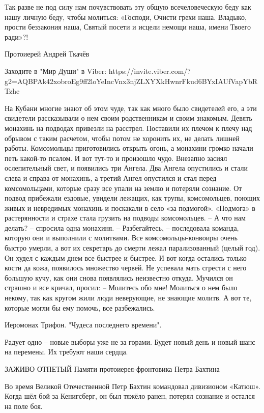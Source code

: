 Так разве не под силу нам почувствовать эту общую всечеловеческую беду как нашу
личную беду, чтобы молиться: «Господи, Очисти грехи наша. Владыко, прости
беззакония наша, Святый посети и исцели немощи наша, имени Твоего ради»?!

Протоиерей Андрей Ткачёв

Заходите в "Мир Души" в Viber: https://invite.viber.com/?g2=AQBPAk42xobroEg9ff2loYeIncVnx3njZLXYXkHwnrFkud6BYxIAUfVapYbRTzhe

На Кубани многие знают об этом чуде, так как много было свидетелей его, а эти свидетели рассказывали о нем своим родственникам и своим знакомым.
Девять монахинь на подводах привезли на расстрел. Поставили их плечом к плечу над обрывом с таким расчетом, чтобы потом не хоронить их, не делать лишней работы.
Комсомольцы приготовились открыть огонь, а монахини громко начали петь какой-то псалом.
И вот тут-то и произошло чудо. Внезапно засиял ослепительный свет, и появились три Ангела. Два Ангела опустились и стали слева и справа от монахинь, а третий Ангел опустился и стал перед комсомольцами, которые сразу все упали на землю и потеряли сознание.
От подвод прибежали ездовые, увидели лежащих, как трупы, комсомольцев, поющих живых и невредимых монахинь и поскакали в село «за подмогой». «Подмога» в растерянности и страхе стала грузить на подводы комсомольцев. – А что нам делать? – спросила одна монахиня. – Разбегайтесь, – последовала команда, которую они и выполнили с молитвами.
Все комсомольцы-конвоиры очень быстро умерли, а вот их секретарь до смерти лежал парализованный (целый год). Он худел с каждым днем все быстрее и быстрее. И вот когда остались только кости да кожа, появилось множество червей. Не успевала мать сгрести с него большую кучу, как они снова появлялись неизвестно откуда.
Мучился он страшно и все кричал, просил: – Молитесь обо мне!
Молиться о нем было некому, так как кругом жили люди неверующие, не знающие молитв.
А вот те, которые могли бы ему помочь, все разбежались.

Иеромонах Трифон. "Чудеса последнего времени".

Радует одно – новые выборы уже не за горами. Будет новый день и новый шанс на перемены.
Их требуют наши сердца.

ЗАЖИВО ОТПЕТЫЙ
Памяти протоиерея-фронтовика Петра Бахтина

Во время Великой Отечественной Петр Бахтин командовал дивизионом «Катюш». Когда шёл бой за Кенигсберг, он был тяжёло ранен, потерял сознание и остался на поле боя.

